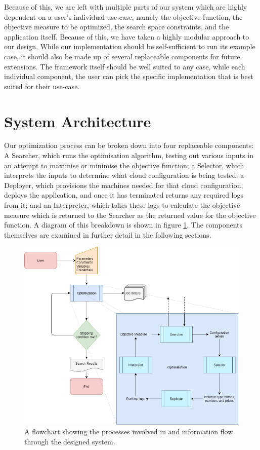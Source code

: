 \documentclass{report}
\begin{document}
Because of this, we are left with multiple parts of our system which are highly dependent on a user's individual use-case, namely the objective function, the objective measure to be optimized, the search space constraints, and the application itself. Because of this, we have taken a highly modular approach to our design. While our implementation should be self-sufficient to run its example case, it should also be made up of several replaceable components for future extensions. The framework itself should be well suited to any case, while each individual component, the user can pick the specific implementation that is best suited for their use-case.
 
\section{System Architecture}
Our optimization process can be broken down into four replaceable components: A Searcher, which runs the optimisation algorithm, testing out various inputs in an attempt to maximise or minimise the objective function; a Selector, which interprets the inputs to determine what cloud configuration is being tested; a Deployer, which provisions the machines needed for that cloud configuration, deploys the application, and once it has terminated returns any required logs from it; and an Interpreter, which takes these logs to calculate the objective measure which is returned to the Searcher as the returned value for the objective function. A diagram of this breakdown is shown in figure \ref{fig:design}. The components themselves are examined in further detail in the following sections.
\begin{figure}[!hb]
  \centering
   \includegraphics[scale=0.5]{Design_flowchart}
  \caption{A flowchart showing the processes involved in and information flow through the designed system.}
  \label{fig:design}
\end{figure}
\newpage
 
\end{document}
